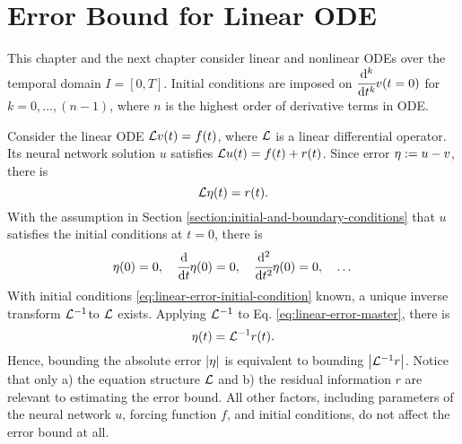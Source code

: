 
\chapter{Error Bound for Linear ODE}  \label{chapter:error-bound-for-linear-odes}
    This chapter and the next chapter consider linear and nonlinear ODEs over the temporal domain $I=[0, T]$. 
    Initial conditions are imposed on $\cfrac{\mathrm{d}^k}{\mathrm{d}t^k}v(t=0)$ for $k = 0, \dots, (n - 1)$, where $n$ is the highest order of derivative terms in ODE.

    Consider the linear ODE $\mathcal{L} v(t) = f(t)$, where $\mathcal{L}$ is a linear differential operator. 
    Its neural network solution $u$ satisfies $\mathcal{L} u(t) = f(t) + r(t)$. 
    Since error $\eta := u - v$, there is
    {   
        \begin{equation} \label{eq:linear-error-master}
            \mathcal{L} \eta(t) = r(t).
        \end{equation}
    }
    With the assumption in Section \ref{section:initial-and-boundary-conditions} that $u$ satisfies the initial conditions at $t=0$, there is
    {
        \begin{equation} \label{eq:linear-error-initial-condition}
            \eta(0) = 0, \quad \cfrac{\mathrm{d} }{\mathrm{d} t}{}\eta(0) = 0, \quad \cfrac{\mathrm{d}^{2} }{\mathrm{d} t^{2}}\eta(0) = 0, \quad \dots 
        \end{equation}
    }
    With initial conditions \eqref{eq:linear-error-initial-condition} known, a unique inverse transform $\mathcal{L}^{-1}$to $\mathcal{L}$ exists. 
    Applying $\mathcal{L}^{-1}$ to Eq. \eqref{eq:linear-error-master}, there is 
    {
        \begin{equation}\label{eq:linear-error-inverse-master}
            \eta(t) = \mathcal{L}^{-1} r(t).
        \end{equation}
    }
    Hence, bounding the absolute error $\left|\eta\right|$ is equivalent to bounding $\left|\mathcal{L}^{-1} r\right|$. 
    Notice that only a) the equation structure $\mathcal{L}$ and b) the residual information $r$ are relevant to estimating the error bound. 
    All other factors, including parameters of the neural network $u$, forcing function $f$, and initial conditions, do not affect the error bound at all.

